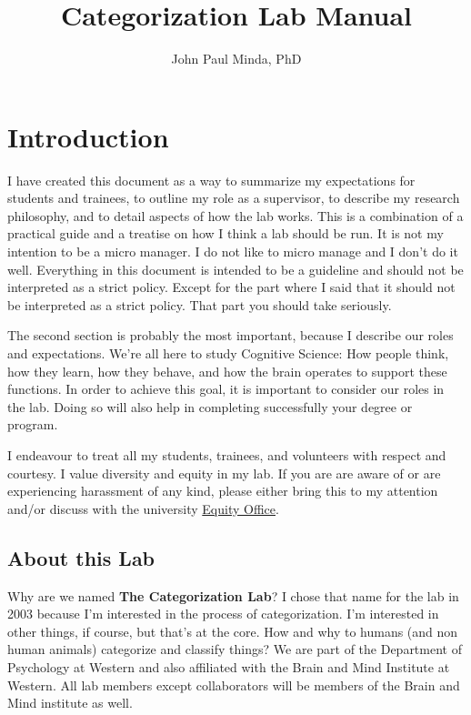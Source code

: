 \documentclass{article}
\title{Categorization Lab Manual}
\author{John Paul Minda, PhD}
\begin{document}
\maketitle
\tableofcontents

\section{Introduction} 
I have created this document as a way to summarize my expectations for students and trainees, to outline my role as a supervisor, to describe my research philosophy, and to detail aspects of how the lab works. This is a combination of a practical guide and a treatise on how I think a lab should be run. It is not my intention to be a micro manager. I do not like to micro manage and I don't do it well. Everything in this document is intended to be a guideline and should not be interpreted as a strict policy. Except for the part where I said that it should not be interpreted as a strict policy. That part you should take seriously.

The second section is probably the most important, because I describe our roles and expectations. We're all here to study Cognitive Science: How people think, how they learn, how they behave, and how the brain operates to support these functions. In order to achieve this goal, it is important to consider our roles in the lab. Doing so will also help in completing successfully your degree or program. 

I endeavour to treat all my students, trainees, and volunteers with respect and courtesy. I value diversity and equity in my lab. If you are are aware of or are experiencing harassment of any kind, please either bring this to my attention and/or discuss with the university \href{http://www.uwo.ca/equity/}{Equity Office}. 

\subsection{About this Lab}
Why are we named \textbf{The Categorization Lab}? I chose that name for the lab in 2003 because I'm interested in the process of categorization. I'm interested in other things, if course, but that's at the core. How and why to humans (and non human animals) categorize and classify things? We are part of the Department of Psychology at Western and also affiliated with the Brain and Mind Institute at Western. All lab members except collaborators will be members of the Brain and Mind institute as well. 
\end{document}
